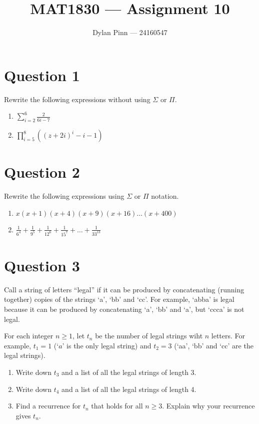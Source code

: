 \documentclass[11pt]{article}
\begin{document}
\title{MAT1830 --- Assignment 10}
\author{Dylan Pinn --- 24160547}
\maketitle

\section*{Question 1}
Rewrite the following expressions without using $\Sigma$ or $\Pi$.

\begin{enumerate}[label= (\alph*)]
  \item $\sum_{i=2}^{6} \frac{2}{6i - 7}$

  \item $\prod_{i=5}^{8} ({(z + 2i)}^{i} - i - 1)$

\end{enumerate}

\section*{Question 2}
Rewrite the following expressions using $\Sigma$ or $\Pi$ notation.

\begin{enumerate}[label= (\alph*)]
  \item $x(x+1)(x+4)(x+9)(x+16) \dots (x+400)$

  \item $\frac{1}{6^4} + \frac{1}{9^5} + \frac{1}{12^6} + \frac{1}{15^7} + \dots
    + \frac{1}{33^{13}}$

\end{enumerate}

\section*{Question 3}
Call a string of letters ``legal'' if it can be produced by concatenating
(running together) copies of the strings `a', `bb' and `cc'. For example, `abba'
is legal because it can be produced by concatenating `a', `bb' and `a', but
`ccca' is not legal.

For each integer $n \geq 1$, let $t_n$ be the number of legal strings wiht $n$
letters. For example, $t_1 = 1$ (`$a$' is the only legal string) and $t_2 = 3$
(`aa', `bb' and `cc' are the legal strings).

\begin{enumerate}[label= (\alph*)]
  \item Write down $t_3$ and a list of all the legal strings of length 3.

  \item Write down $t_4$ and a list of all the legal strings of length 4.

  \item Find a recurrence for $t_n$ that holds for all $n \geq 3$. Explain why
    your recurrence gives $t_n$.

\end{enumerate}
\end{document}
